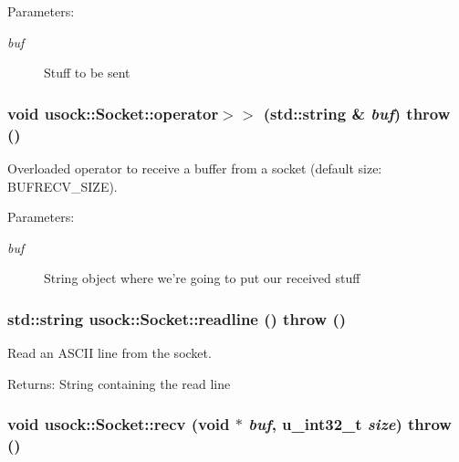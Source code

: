 \begin{Desc}
\item[Parameters:]
\begin{description}
\item[{\em buf}]Stuff to be sent \end{description}
\end{Desc}
\hypertarget{classusock_1_1Socket_9796319ece2e7d7f7463608f00413457}{
\subsubsection[{operator$>$$>$}]{\setlength{\rightskip}{0pt plus 5cm}void usock::Socket::operator$>$$>$ (std::string \& {\em buf})  throw ()}}
\label{classusock_1_1Socket_9796319ece2e7d7f7463608f00413457}


Overloaded operator to receive a buffer from a socket (default size: BUFRECV\_\-SIZE). 

\begin{Desc}
\item[Parameters:]
\begin{description}
\item[{\em buf}]String object where we're going to put our received stuff \end{description}
\end{Desc}
\hypertarget{classusock_1_1Socket_179bbc1c0b837c0e73c22c1b9bc149eb}{
\subsubsection[{readline}]{\setlength{\rightskip}{0pt plus 5cm}std::string usock::Socket::readline ()  throw ()}}
\label{classusock_1_1Socket_179bbc1c0b837c0e73c22c1b9bc149eb}


Read an ASCII line from the socket. 

\begin{Desc}
\item[Returns:]String containing the read line \end{Desc}
\hypertarget{classusock_1_1Socket_852c343031c5516f747577ee6f3fc96e}{
\subsubsection[{recv}]{\setlength{\rightskip}{0pt plus 5cm}void usock::Socket::recv (void $\ast$ {\em buf}, \/  u\_\-int32\_\-t {\em size})  throw ()}}
\label{classusock_1_1Socket_852c343031c5516f747577ee6f3fc96e}


